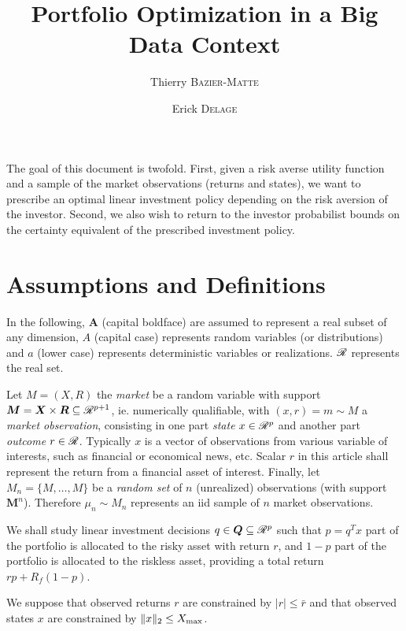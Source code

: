 \documentclass[11pt]{article}
\title{Portfolio Optimization in a Big Data Context}
\author{Thierry \textsc{Bazier-Matte} \and Erick \textsc{Delage}}
\begin{document}
\maketitle


The goal of this document is twofold. First, given a risk averse utility function and a
sample of the market observations (returns and states), we want to prescribe an optimal
linear investment policy depending on the risk aversion of the investor. Second, we also
wish to return to the investor probabilist bounds on the certainty equivalent of the
prescribed investment policy.

\section{Assumptions and Definitions}

In the following, $\bm A$ (capital boldface) are assumed to represent a real subset of any
dimension, $A$ (capital case) represents random variables (or distributions) and $a$
(lower case) represents deterministic variables or realizations. $\mathscr{R}$ represents the
real set.

Let $M=(X,R)$ the \textsl{market} be a random variable with support
$\bm M = \bm X\times \bm R \subseteq\mathscr{R}^{p+1}$, ie. numerically qualifiable, with
$(x,r) = m\sim M$ a \textsl{market observation}, consisting in one part \textsl{state}
$x\in\mathscr{R}^p$ and another part \textsl{outcome} $r\in\mathscr{R}$. Typically $x$ is a vector of
observations from various variable of interests, such as financial or economical news,
etc. Scalar $r$ in this article shall represent the return from a financial asset of
interest. Finally, let $M_n = \{M,\dots,M\}$ be a \textsl{random set} of $n$ (unrealized)
observations (with support $\bm M^n$). Therefore $\mu_n \sim M_n$ represents an iid sample
of $n$ market observations.

We shall study linear investment decisions $q\in\bm Q\subseteq\mathscr{R}^p$ such that $p=q^Tx$
part of the portfolio is allocated to the risky asset with return $r$, and $1-p$ part of
the portfolio is allocated to the riskless asset, providing a total return
$rp + R_f(1-p)$.
\begin{assumption}
  We suppose that observed returns $r$ are constrained by $|r| \leq \bar r$ and that
  observed states $x$ are constrained by $\|x\|_2 \leq X_{\max}$.
\end{assumption}
\end{document}

